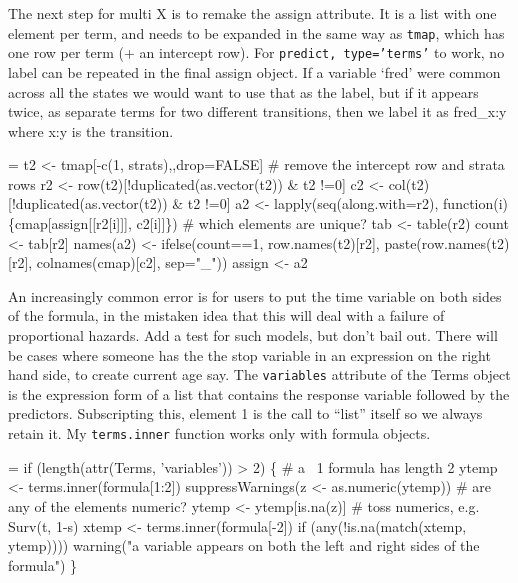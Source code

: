 \documentclass{article}
\newcommand{\code}[1]{\texttt{#1}}
\begin{document}
The next step for multi X is to remake the assign attribute. 
It is a list with one element per term, and needs to be expanded in the
same way as \code{tmap}, which has one row per term (+ an intercept row).
For \code{predict, type='terms'} to work, no label can be repeated in the
final assign object. 
If a variable `fred' were common across all the states we would want to
use that as the label, but if it appears twice, as separate terms for
two different transitions, then we label it as fred\_x:y where x:y is the
transition.
\begin{nwchunk}
=
 t2 <- tmap[-c(1, strats),,drop=FALSE]   # remove the intercept row and strata rows
 r2 <- row(t2)[!duplicated(as.vector(t2)) & t2 !=0]
 c2 <- col(t2)[!duplicated(as.vector(t2)) & t2 !=0]
 a2 <- lapply(seq(along.with=r2), function(i) \{cmap[assign[[r2[i]]], c2[i]]\})
 # which elements are unique?  
 tab <- table(r2)
 count <- tab[r2]
 names(a2) <- ifelse(count==1, row.names(t2)[r2],
                     paste(row.names(t2)[r2], colnames(cmap)[c2], sep="_"))
 assign <- a2
\end{nwchunk}

An increasingly common error is for users to put the time variable on
both sides of the formula, in the mistaken idea that this will
deal with a failure of proportional hazards.
Add a test for such models, but don't bail out.  There will be cases where
someone has the the stop variable in an expression on the right hand side,
to create current age say.
The \code{variables} attribute of the Terms object is the expression form
of a list that contains the response variable followed by the predictors.
Subscripting this, element 1 is the call to ``list'' itself so we always
retain it.  My \code{terms.inner} function works only with formula
objects. 
\begin{nwchunk}
=
 if (length(attr(Terms, 'variables')) > 2) \{ # a ~1 formula has length 2
     ytemp <- terms.inner(formula[1:2])
     suppressWarnings(z <- as.numeric(ytemp)) # are any of the elements numeric?
     ytemp <- ytemp[is.na(z)]  # toss numerics, e.g. Surv(t, 1-s)
     xtemp <- terms.inner(formula[-2])
     if (any(!is.na(match(xtemp, ytemp))))
         warning("a variable appears on both the left and right sides of the formula")
 \}
\end{nwchunk}
\end{document}
